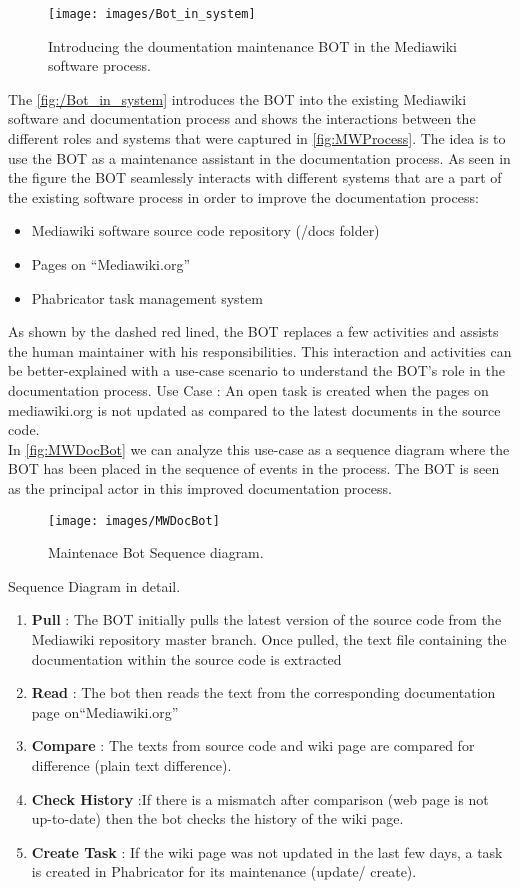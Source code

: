 \begin{figure}[H]
  \centering
  \texttt{[image: images/Bot\_in\_system]}
  \caption[Introducing the doumentation maintenance BOT in the Mediawiki software process]{Introducing the doumentation maintenance BOT in the Mediawiki software process.}\label{fig:/Bot_in_system}
\end{figure}
The \autoref{fig:/Bot_in_system} introduces the BOT into the existing Mediawiki software and documentation process and shows the interactions between the different roles and systems that were captured in \autoref{fig:MWProcess}.
\indent The idea is to use the BOT as a maintenance assistant in the documentation process. As seen in the figure the BOT seamlessly interacts with different systems that are a part of the existing software process in order to improve the documentation process:
\begin{itemize}
\item Mediawiki software source code repository (/docs folder)
\item Pages on \enquote{Mediawiki.org}
\item Phabricator task management system
\end{itemize}
As shown by the dashed red lined, the BOT replaces a few activities and assists the human maintainer with his responsibilities.
This interaction and activities can be better-explained with a use-case scenario to understand the BOT's role in the documentation process. 
\indent Use Case : An open task is created when the pages on mediawiki.org is not updated as compared to the latest documents in the source code.
\\\indent  In \autoref{fig:MWDocBot} we can analyze this use-case as a sequence diagram where the BOT has been placed in the sequence of events in the process. The BOT is seen as the principal actor in this improved documentation process.
\begin{figure}[H]
  \centering
  \texttt{[image: images/MWDocBot]}
  \caption[Maintenace Bot Sequence diagram]{Maintenace Bot Sequence diagram.}\label{fig:MWDocBot}
\end{figure}
Sequence Diagram in detail. 
\begin{enumerate}
\item \textbf{Pull} : The BOT initially pulls the latest version of the source code from the Mediawiki repository master branch. Once pulled, the text file containing the documentation within the source code is extracted
\item \textbf{Read} : The bot then reads the text from the corresponding documentation page on\enquote{Mediawiki.org}
\item \textbf{Compare} : The texts from source code and wiki page are compared for difference (plain text difference).
\item \textbf{Check History} :If there is a mismatch after comparison (web page is not up-to-date) then the bot checks the history of the wiki  page.
\item \textbf{Create Task} : If the wiki page was not updated in the last few days, a task is created in Phabricator for its maintenance (update/ create).
\end{enumerate}
